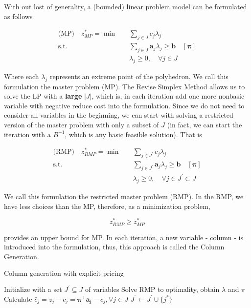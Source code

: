         With out lost of generality, a (bounded) linear problem model can be formulated as follows

        \begin{align*}
            \text{(MP)} \quad  z_{MP}^* = \min \quad & \sum_{j \in J} c_j \lambda_j\\
            \text{s.t.} \quad & \sum_{j \in J} \mathbf{a}_j \lambda_j \ge \mathbf{b} \quad [\mathbf{\pi}]\\
            &\lambda_j \ge 0, \quad \forall j \in J
        \end{align*}

        Where each $\lambda_j$ represents an extreme point of the polyhedron. We call this formulation the master problem (MP). The Revise Simplex Method allows us to solve the LP with a \textbf{large} $|J|$, which is, in each iteration add one more nonbasic variable with negative reduce cost into the formulation. Since we do not need to consider all variables in the beginning, we can start with solving a restricted version of the master problem with only a subset of $J$ (in fact, we can start the iteration with a $B^{-1}$, which is any basic feasible solution). That is

        \begin{align*}
            \text{(RMP)} \quad  z_{RMP}^* = \min \quad & \sum_{j \in J^\prime} c_j \lambda_j\\
            \text{s.t.} \quad & \sum_{j \in J^\prime} \mathbf{a}_j \lambda_j \ge \mathbf{b} \quad [\mathbf{\pi}]\\
            &\lambda_j \ge 0, \quad \forall j \in J^\prime \subset J
        \end{align*}

        We call this formulation the restricted master problem (RMP). In the RMP, we have less choices than the MP, therefore, as a minimization problem, 

        \begin{equation*}
            z_{RMP}^* \ge z_{MP}^*
        \end{equation*}

        provides an upper bound for MP. In each iteration, a new variable - column - is introduced into the formulation, thus, this approach is called the Column Generation.

        \begin{algorithm}[!htp]
            \centering
            \caption{Column generation with explicit pricing}
            \begin{algorithmic}
                \State Initialize with a set $J^\prime \subseteq J$ of variables
                \Repeat
                    \State Solve RMP to optimality, obtain $\lambda$ and $\pi$
                    \State Calculate $\bar{c}_j = z_j - c_j = \mathbf{\pi^\top a_j} - c_j, \forall j \in J$
                        \State $J^\prime \gets J^\prime \cup \{j^*\}$
                    \EndIf
            \end{algorithmic}
        \end{algorithm}
        
